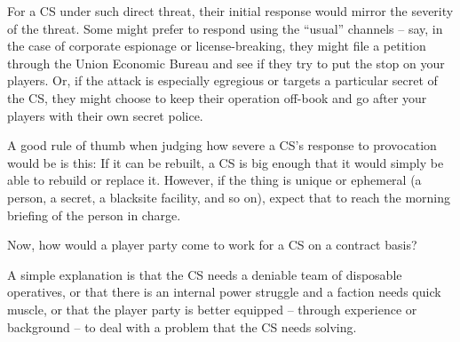 For a CS under such direct threat, their initial response would mirror the severity of the threat.
Some might prefer to respond using the “usual” channels -- say, in the case of corporate
espionage or license-breaking, they might file a petition through the Union Economic Bureau and
see if they try to put the stop on your players. Or, if the attack is especially egregious or targets a
particular secret of the CS, they might choose to keep their operation off-book and go after your
players with their own secret police.

A good rule of thumb when judging how severe a CS’s response to provocation would be is this: If
it can be rebuilt, a CS is big enough that it would simply be able to rebuild or replace it. However,
if the thing is unique or ephemeral (a person, a secret, a blacksite facility, and so on), expect that
to reach the morning briefing of the person in charge.

Now, how would a player party come to work for a CS on a contract basis?

A simple explanation is that the CS needs a deniable team of disposable operatives, or that there
is an internal power struggle and a faction needs quick muscle, or that the player party is better
equipped -- through experience or background -- to deal with a problem that the CS needs
solving.